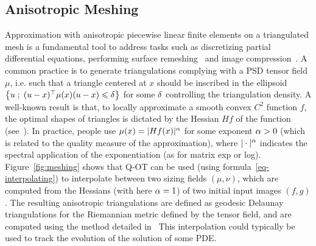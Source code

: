 

\subsection{Anisotropic Meshing}

Approximation with anisotropic piecewise linear finite elements on a triangulated mesh is a fundamental tool to address tasks such as discretizing partial differential equations, performing surface remeshing~\cite{alliez2003anisotropic} and image compression~\cite{demaret2006image}.
%
A common practice is to generate triangulations complying with a PSD tensor field $\mu$, i.e. such that a triangle centered at $x$ should be inscribed in the ellipsoid $\left\{ u \;;\; (u-x)^\top \mu(x) (u-x) \leqslant \delta  \right\}$ for some $\delta$ controlling the triangulation density. 
%
A well-known result is that, to locally approximate a smooth convex $C^2$ function $f$,  the optimal shapes of triangles is dictated by the Hessian $H f$ of the function (see~\cite{shewchuk2002good}). In practice, people use $\mu(x) = |H f(x)|^\alpha$ for some exponent $\alpha > 0$ (which is related to the quality measure of the approximation), where $|\cdot|^\alpha$ indicates the spectral application of the exponentiation (as for matrix exp or log).
%
Figure~\eqref{fig:meshing} shows that Q-OT can be used (using formula~\eqref{eq-interpolating}) to interpolate between two sizing fields $(\mu,\nu)$, which are computed from the Hessians (with here $\alpha=1$) of two initial input images $(f,g)$.
%
The resulting anisotropic triangulations are defined as geodesic Delaunay triangulations for the Riemannian metric defined by the tensor field, and are computed using the method detailed in~\cite{peyre-iccv-09}
%
This interpolation could typically be used to track the evolution of the solution of some PDE. 

